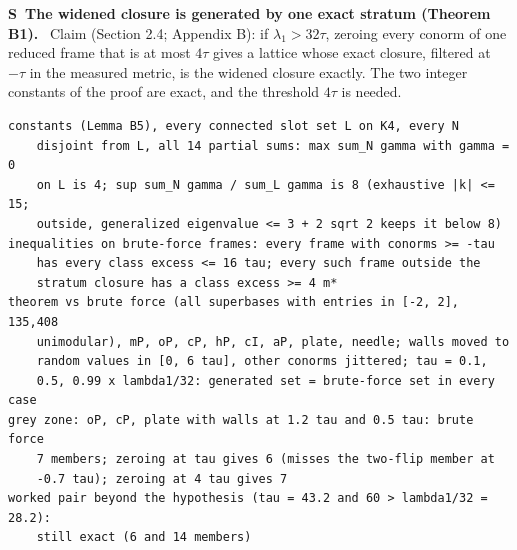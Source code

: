 \documentclass[11pt]{article}
\newcounter{scheck}
\renewcommand{\thescheck}{S\arabic{scheck}}
\newcommand{\sitem}[2]{\medskip\noindent\refstepcounter{scheck}\label{#1}\textbf{\thescheck\ #2.}\ }
\begin{document}
\sitem{z:widened-complete}{The widened closure is generated by one exact stratum (Theorem B1)}
Claim (Section 2.4; Appendix B): if $\lambda_1>32\tau$, zeroing every conorm of one reduced frame that is at most $4\tau$ gives a lattice whose exact closure, filtered at $-\tau$ in the measured metric, is the widened closure exactly. The two integer constants of the proof are exact, and the threshold $4\tau$ is needed.
\begin{footnotesize}\begin{verbatim}
constants (Lemma B5), every connected slot set L on K4, every N
    disjoint from L, all 14 partial sums: max sum_N gamma with gamma = 0
    on L is 4; sup sum_N gamma / sum_L gamma is 8 (exhaustive |k| <= 15;
    outside, generalized eigenvalue <= 3 + 2 sqrt 2 keeps it below 8)
inequalities on brute-force frames: every frame with conorms >= -tau
    has every class excess <= 16 tau; every such frame outside the
    stratum closure has a class excess >= 4 m*
theorem vs brute force (all superbases with entries in [-2, 2], 135,408
    unimodular), mP, oP, cP, hP, cI, aP, plate, needle; walls moved to
    random values in [0, 6 tau], other conorms jittered; tau = 0.1,
    0.5, 0.99 x lambda1/32: generated set = brute-force set in every case
grey zone: oP, cP, plate with walls at 1.2 tau and 0.5 tau: brute force
    7 members; zeroing at tau gives 6 (misses the two-flip member at
    -0.7 tau); zeroing at 4 tau gives 7
worked pair beyond the hypothesis (tau = 43.2 and 60 > lambda1/32 = 28.2):
    still exact (6 and 14 members)
\end{verbatim}\end{footnotesize}
\end{document}
